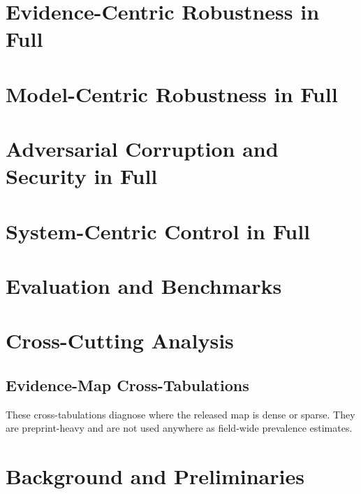 \documentclass[11pt]{article}
\begin{document}


\FloatBarrier
\section{Evidence-Centric Robustness in Full}
\label{app:evidence}


\FloatBarrier
\section{Model-Centric Robustness in Full}
\label{app:model}


\FloatBarrier
\section{Adversarial Corruption and Security in Full}
\label{app:adversarial}


\FloatBarrier
\section{System-Centric Control in Full}
\label{app:system}


\FloatBarrier
\section{Evaluation and Benchmarks}
\label{app:evaluation}


\FloatBarrier
\section{Cross-Cutting Analysis}
\label{app:crosscut}




\FloatBarrier
\subsection{Evidence-Map Cross-Tabulations}
\label{sec:map-statistics}
These cross-tabulations diagnose where the released map is dense or sparse. They
are preprint-heavy and are not used anywhere as field-wide prevalence estimates.


\FloatBarrier
\section{Background and Preliminaries}
\label{app:background}

\end{document}
